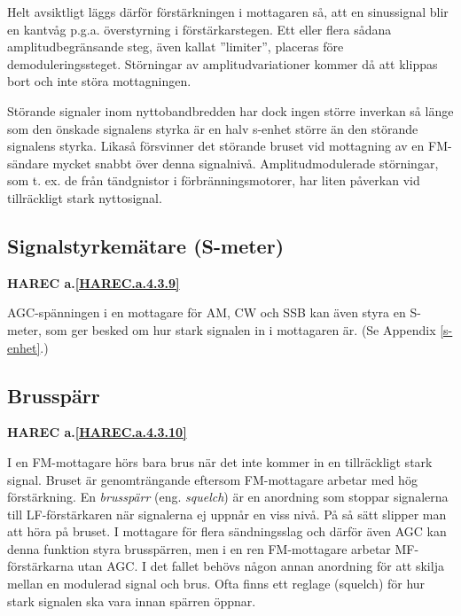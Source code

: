 Helt avsiktligt läggs därför förstärkningen i mottagaren så, att en
sinussignal blir en kantvåg p.g.a. överstyrning i
förstärkarstegen. Ett eller flera sådana amplitudbegränsande steg,
även kallat ''limiter'', placeras före demoduleringssteget. Störningar
av amplitudvariationer kommer då att klippas bort och inte störa
mottagningen.

Störande signaler inom nyttobandbredden har dock ingen större inverkan
så länge som den önskade signalens styrka är en halv s-enhet större än
den störande signalens styrka. Likaså försvinner det störande bruset
vid mottagning av en FM-sändare mycket snabbt över denna signalnivå.
Amplitudmodulerade störningar, som t. ex. de från tändgnistor i
förbränningsmotorer, har liten påverkan vid tillräckligt stark
nyttosignal.

\subsection{Signalstyrkemätare (S-meter)}
\textbf{HAREC a.\ref{HAREC.a.4.3.9}\label{myHAREC.a.4.3.9}}

AGC-spänningen i en mottagare för AM, CW och SSB kan även styra en
S-meter, som ger besked om hur stark signalen in i mottagaren är. (Se
Appendix \ref{s-enhet}.)

\subsection{Brusspärr}
\textbf{HAREC a.\ref{HAREC.a.4.3.10}\label{myHAREC.a.4.3.10}}

I en FM-mottagare hörs bara brus när det inte kommer in en
tillräckligt stark signal.  Bruset är genomträngande eftersom
FM-mottagare arbetar med hög förstärkning. En \emph{brusspärr}
(eng. \emph{squelch})
är en anordning som stoppar signalerna till LF-förstärkaren när
signalerna ej uppnår en viss nivå. På så sätt slipper man att höra på
bruset. I mottagare för flera sändningsslag och därför även AGC kan
denna funktion styra brusspärren, men i en ren FM-mottagare arbetar
MF-förstärkarna utan AGC. I det fallet behövs någon annan anordning för
att skilja mellan en modulerad signal och brus. Ofta finns ett reglage
(squelch) för hur stark signalen ska vara innan spärren öppnar.
